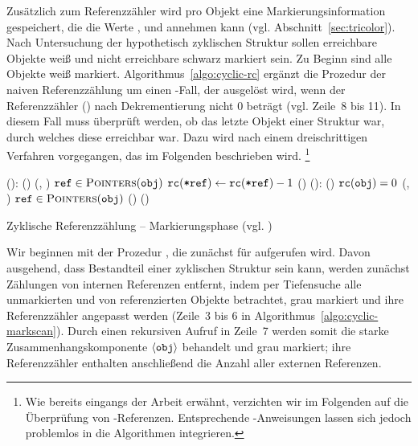 Zusätzlich zum Referenzzähler wird pro Objekt eine Markierungsinformation gespeichert, die die Werte ,  und  annehmen kann (vgl. Abschnitt~\ref{sec:tricolor}).
Nach Untersuchung der hypothetisch zyklischen Struktur sollen erreichbare Objekte weiß und nicht erreichbare schwarz markiert sein.
Zu Beginn sind alle Objekte weiß markiert.
Algorithmus~\ref{algo:cyclic-rc} ergänzt die Prozedur  der naiven Referenzzählung um einen \ELSE-Fall, der ausgelöst wird, wenn der Referenzzähler () nach Dekrementierung nicht $0$ beträgt (vgl. Zeile~8 bis 11).
In diesem Fall muss überprüft werden, ob  das letzte Objekt einer Struktur war, durch welches diese erreichbar war.
Dazu wird nach einem dreischrittigen Verfahren vorgegangen, das im Folgenden beschrieben wird. \footnote{Wie bereits eingangs der Arbeit erwähnt, verzichten wir im Folgenden auf die Überprüfung von \Null-Referenzen. Entsprechende \IF-Anweisungen lassen sich jedoch problemlos in die Algorithmen integrieren.}

\begin{algorithm}[h]
\begin{algorithmic}[1]
	\State {}():
	\State \quad \IF {}()
	\State \quad \quad {}(, )
	\State \quad \quad \FOREACH $\texttt{ref} \in \textsc{Pointers}(\texttt{obj})$	
	\State \quad \quad \quad $\texttt{rc}(\texttt{*ref}) \gets \texttt{rc}(\texttt{*ref})-1$ 
	\State \quad \quad \quad {}()	
	\Statex
	\State {}():
	\State \quad \IF {}()
	\State \quad \quad \IF $\texttt{rc}(\texttt{obj}) = 0$	
	\State \quad \quad \quad {}(, )
	\State \quad \quad \quad \FOREACH $\texttt{ref} \in \textsc{Pointers}(\texttt{obj})$
	\State \quad \quad \quad \quad {}()	
	\State \quad \quad \ELSE {}()	
\end{algorithmic}
\caption[Zyklische Referenzzählung -- Markierungsphase]{Zyklische Referenzzählung -- Markierungsphase (vgl. \cite[S. 32f]{martinez1990})}
\label{algo:cyclic-markscan}
\end{algorithm}

Wir beginnen mit der Prozedur , die zunächst für  aufgerufen wird.
Davon ausgehend, dass  Bestandteil einer zyklischen Struktur sein kann, werden zunächst Zählungen von internen Referenzen entfernt, indem per Tiefensuche alle unmarkierten und von  referenzierten Objekte betrachtet, grau markiert und ihre Referenzzähler angepasst werden (Zeile~3 bis 6 in Algorithmus~\ref{algo:cyclic-markscan}).
Durch einen rekursiven Aufruf in Zeile~7 werden somit die starke Zusammenhangskomponente $\left\langle\texttt{obj}\right\rangle$ behandelt und grau markiert; ihre Referenzzähler enthalten anschließend die Anzahl aller externen Referenzen.

